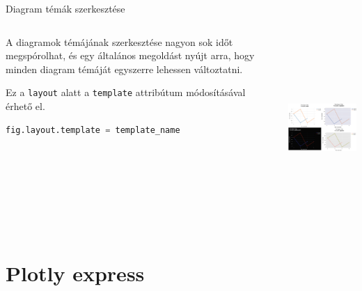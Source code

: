 \documentclass[english, aspectratio=169]{beamer}
\makeatletter
\let\origtableofcontents=\tableofcontents
\def\tableofcontents{\@ifnextchar[{\origtableofcontents}{\gobbletableofcontents}}
\def\gobbletableofcontents#1{\origtableofcontents}
\makeatother
\begin{document}
	\begin{frame}[fragile]{Diagram témák szerkesztése}
		\begin{columns}
			\begin{column}{.5\textwidth}
				A diagramok témájának szerkesztése nagyon sok időt megspórolhat, és egy általános megoldást nyújt arra, hogy minden diagram témáját egyszerre lehessen változtatni.\par\smallskip
				Ez a \texttt{layout} alatt a \texttt{template} attribútum módosításával érhető el. 
				\begin{lstlisting}[language=python]
fig.layout.template = template_name
				\end{lstlisting}	
			\end{column}
			\begin{column}{.5\textwidth}
				\begin{center}
					\includegraphics[width=7cm, height=7cm, keepaspectratio]{images/plots_7.png}
				\end{center}
			\end{column}
		\end{columns}
	\end{frame}
	
	\section{Plotly express}
	
	\begin{frame}{}
		\tableofcontents[currentsection]
	\end{frame}
	
\end{document}
